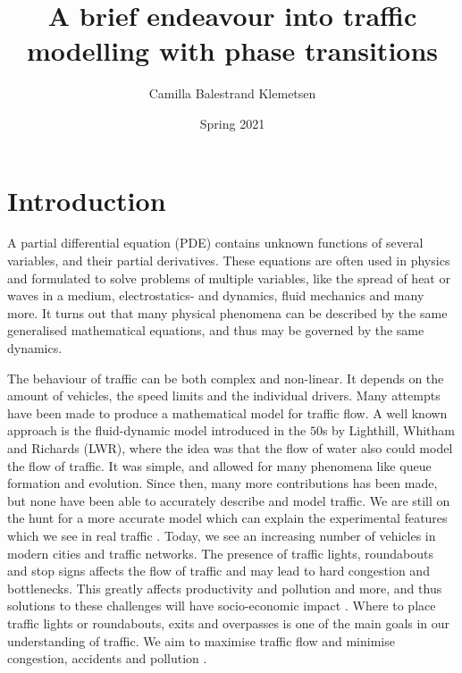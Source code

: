 \documentclass[10pt]{article}
\title{A brief endeavour into traffic modelling with phase transitions}
\author{Camilla Balestrand Klemetsen}
\date{Spring 2021}
\numberwithin{equation}{section}
\begin{document}
\maketitle
\newpage
{}


\tableofcontents 

\newpage
{}

\section{Introduction}
A partial differential equation (PDE) contains unknown functions of several variables, and their partial derivatives. These equations are often used in physics and formulated to solve problems of multiple variables, like the spread of heat or waves in a medium, electrostatics- and dynamics, fluid mechanics and many more. It turns out that many physical phenomena can be described by the same generalised mathematical equations, and thus may be governed by the same dynamics.

The behaviour of traffic can be both complex and non-linear. It depends on the amount of vehicles, the speed limits and the individual drivers. Many attempts have been made to produce a mathematical model for traffic flow. A well known approach is the fluid-dynamic model introduced in the $50$s by Lighthill, Whitham and Richards (LWR), where the idea was that the flow of water also could model the flow of traffic. It was simple, and allowed for many phenomena like queue formation and evolution. Since then, many more contributions has been made, but none have been able to accurately describe and model traffic. We are still on the hunt for a more accurate model which can explain the experimental features which we see in real traffic \cite{KernerHelbing}. Today, we see an increasing number of vehicles in modern cities and traffic networks. The presence of traffic lights, roundabouts and stop signs affects the flow of traffic and may lead to hard congestion and bottlenecks. This greatly affects productivity and pollution and more, and thus solutions to these challenges will have socio-economic impact \cite{GaravelloMauro2006Tfon}. Where to place traffic lights or roundabouts, exits and overpasses is one of the main goals in our understanding of traffic. We aim to maximise traffic flow and minimise congestion, accidents and pollution \cite{GaravelloMauro2006Tfon}.
\end{document}

